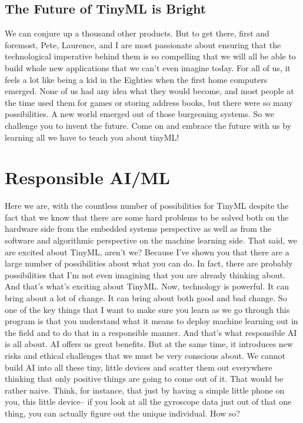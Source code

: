 \subsection{The Future of TinyML is Bright}

We can conjure up a thousand other products. But to get there, first and foremost, Pete, Laurence, and I are most passionate about ensuring that the technological imperative behind them is so compelling that we will all be able to build whole new applications that we can’t even imagine today. For all of us, it feels a lot like being a kid in the Eighties when the first home computers emerged. None of us had any idea what they would become, and most people at the time used them for games or storing address books, but there were so many possibilities. A new world emerged out of those burgeoning systems. So we challenge you to invent the future. Come on and embrace the future with us by learning all we have to teach you about tinyML!





\section{Responsible AI/ML}

Here we are, with the countless number of possibilities for TinyML despite the fact that we know that there are some hard problems to be solved both on the hardware side from the embedded systems perspective as well as from the software and algorithmic perspective on the machine learning side.
That said, we are excited about TinyML, aren't we?
Because I've shown you that there are a large number of possibilities about what you can do.
In fact, there are probably possibilities that I'm not even imagining that you are already thinking about.
And that's what's exciting about TinyML.
Now, technology is powerful.
It can bring about a lot of change.
It can bring about both good and bad change.
So one of the key things that I want to make sure you learn as we go through this program is that you understand what it means to deploy machine learning out in the field and to do that in a responsible manner.
And that's what responsible AI is all about.
AI offers us great benefits.
But at the same time, it introduces new risks and ethical challenges that we must be very conscious about.
We cannot build AI into all these tiny, little devices and scatter them out everywhere thinking that only positive things are going to come out of it.
That would be rather naive. 
Think, for instance, that just by having a simple little phone on you, this little device-- if you look at all the gyroscope data just out of that one thing, you can actually figure out the unique individual.
How so?



